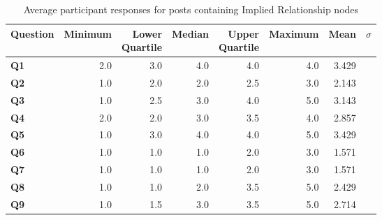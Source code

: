 \begin{table}
\centering
\caption{Average participant responses for posts containing Implied Relationship nodes}
\label{table:perception:implied-relationship-average}
\begin{tabular}{ l | r | r | r | r | r | r | r}
\textbf{Question} & \textbf{Minimum} & \pbox{2cm}{\textbf{Lower}\\ \textbf{Quartile}} & \textbf{Median} & \pbox{2cm}{\textbf{Upper}\\ \textbf{Quartile}} & \textbf{Maximum} & \textbf{Mean} & \textbf{$\sigma$}\\
\hline
\textbf{Q1} &  2.0 & 3.0 & 4.0 & 4.0 & 4.0 & 3.429 &  \\
\hline
\textbf{Q2} &  1.0 & 2.0 & 2.0 & 2.5 & 3.0 & 2.143 &  \\
\hline
\textbf{Q3} &  1.0 & 2.5 & 3.0 & 4.0 & 5.0 & 3.143 &  \\
\hline
\textbf{Q4} &  2.0 & 2.0 & 3.0 & 3.5 & 4.0 & 2.857 &  \\
\hline
\textbf{Q5} &  1.0 & 3.0 & 4.0 & 4.0 & 5.0 & 3.429 &  \\
\hline
\textbf{Q6} &  1.0 & 1.0 & 1.0 & 2.0 & 3.0 & 1.571 &  \\
\hline
\textbf{Q7} &  1.0 & 1.0 & 1.0 & 2.0 & 3.0 & 1.571 &  \\
\hline
\textbf{Q8} &  1.0 & 1.0 & 2.0 & 3.5 & 5.0 & 2.429 &  \\
\hline
\textbf{Q9} &  1.0 & 1.5 & 3.0 & 3.5 & 5.0 & 2.714 &  \\
\end{tabular}
\end{table}




